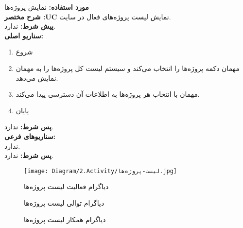 
\textbf{مورد استفاده:}
نمایش پروژه‌ها
\\
\textbf{شرح مختصر :UC}
نمایش لیست پروژه‌های فعال در سایت.
\\
\textbf{پيش شرط:}
ندارد.
\\
\textbf{سناريو اصلی:}
\begin{enumerate}
\item
شروع
\item
مهمان دکمه پروژه‌ها را انتخاب می‌کند و سیستم لیست کل پروژه‌ها را به مهمان نمایش می‌دهد.
\item
مهمان با انتخاب هر پروژه‌ها به اطلاعات آن دسترسی پیدا می‌کند.
\item
پایان
\end{enumerate}

\noindent
\textbf{پس شرط:}
ندارد.
\\
\textbf{سناريوهای فرعی:}
\\
ندارد.
\\
\textbf{پس شرط:}
ندارد.


\begin{figure}[H]
	\centering
	\texttt{[image: Diagram/2.Activity/لیست-پروژه‌ها.jpg]}
	\caption{دیاگرام فعالیت لیست پروژه‌ها}
	\label{fig:a:لیست-پروژه‌ها}
\end{figure}
\begin{figure}[H]
	\centering
	\caption{دیاگرام توالی لیست پروژه‌ها}
	\label{fig:s:لیست-پروژه‌ها}
\end{figure}
\begin{figure}[H]
	\centering
	\caption{دیاگرام همکار لیست پروژه‌ها}
	\label{fig:c:لیست-پروژه‌ها}
\end{figure}